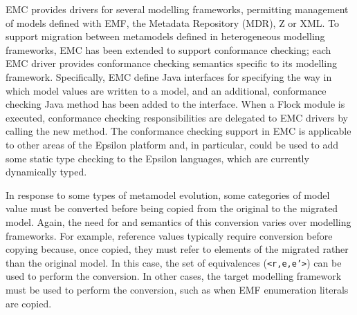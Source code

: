 EMC provides drivers for several modelling frameworks, permitting management of models defined with EMF, the Metadata Repository (MDR), Z or XML. To support migration between metamodels defined in heterogeneous modelling frameworks, EMC has been extended to support conformance checking; each EMC driver provides conformance checking semantics specific to its modelling framework. Specifically, EMC define Java interfaces for specifying the way in which model values are written to a model, and an additional, conformance checking Java method has been added to the interface. When a Flock module is executed, conformance checking responsibilities are delegated to EMC drivers by calling the new method. The conformance checking support in EMC is applicable to other areas of the Epsilon platform and, in particular, could be used to add some static type checking to the Epsilon languages, which are currently dynamically typed.

In response to some types of metamodel evolution, some categories of model value must be converted before being copied from the original to the migrated model. Again, the need for and semantics of this conversion varies over modelling frameworks. For example, reference values typically require conversion before copying because, once copied, they must refer to elements of the migrated rather than the original model. In this case, the set of equivalences (\texttt{<r,e,e'>}) can be used to perform the conversion. In other cases, the target modelling framework must be used to perform the conversion, such as when EMF enumeration literals are copied.

% 

